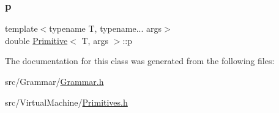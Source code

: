 \mbox{\label{struct_primitive_a43fac47ebf8ec63a70443d80dcd04687}} 
\subsubsection{\texorpdfstring{p}{p}}
{\footnotesize\ttfamily template$<$typename T, typename... args$>$ \\
double \hyperlink{struct_primitive}{Primitive}$<$ T, args $>$\+::p}



The documentation for this class was generated from the following files\+:\begin{DoxyCompactItemize}
\item 
src/\+Grammar/\hyperlink{_grammar_8h}{Grammar.\+h}\item 
src/\+Virtual\+Machine/\hyperlink{_primitives_8h}{Primitives.\+h}\end{DoxyCompactItemize}
